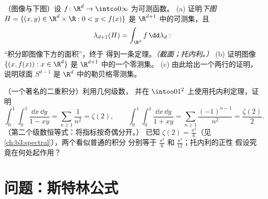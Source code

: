 \begin{exercise}[$\star\star$]\label{exo:b3:product:11}
（图像与下图）设 $f \colon \R^d \to \intco0\infty$
为可测函数。
(a) 证明\emph{下图} $H = \{(x, y) \in
\R^d\times\R : 0 < y < f(x)\}$ 是
$\R^{d+1}$ 中的可测集，且
\[
\lambda_{d+1}(H) = \int_{\R^d}f\,\dd\lambda_d :
\]
“积分即图像下方的面积”，终于
得到一条定理。\emph{（截面；托内利。）}
(b) 证明图像 $\{(x, f(x)) : x \in \R^d\}$ 是
$\R^{d+1}$ 中的一个零测集。
(c) 由此给出一个两行的证明，说明球面 $S^{d-1}$ 是
$\R^d$ 中的勒贝格零测集。
\end{exercise}

\begin{exercise}[$\star\star$]\label{exo:b3:product:12}
（一个著名的二重积分）利用几何级数，
并在 $\intoo01^2$ 上使用托内利定理，证明
\[
\int_0^1\!\!\int_0^1\frac{\dd x\,\dd y}{1 - xy}
= \sum_{n\geq1}\frac1{n^2} = \zeta(2),
\qquad
\int_0^1\!\!\int_0^1\frac{\dd x\,\dd y}{1 + xy}
= \sum_{n\geq1}\frac{(-1)^{n-1}}{n^2} = \frac{\zeta(2)}2 .
\]
（第二个级数恒等式：将指标按奇偶分开。）
已知 $\zeta(2) = \frac{\pi^2}6$（见\cref{ch:b3:spectral}），两个看似普通的积分
分别等于 $\frac{\pi^2}6$ 和
$\frac{\pi^2}{12}$；托内利的正性
假设究竟在何处起作用？
\end{exercise}

\section{问题：斯特林公式}

